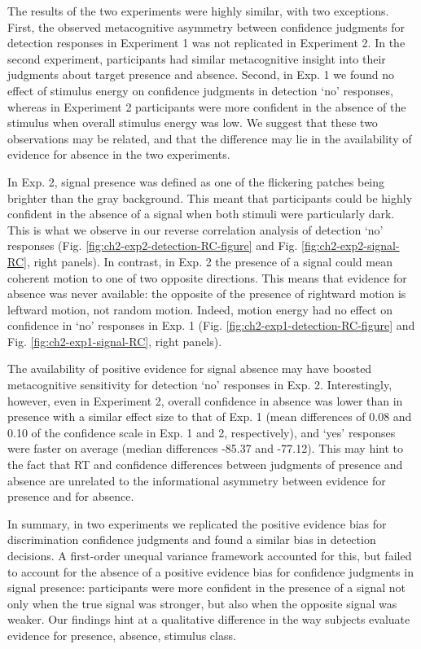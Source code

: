 \documentclass[12pt,twoside]{reedthesis}
\begin{document}
The results of the two experiments were highly similar, with two exceptions. First, the observed metacognitive asymmetry between confidence judgments for detection responses in Experiment 1 was not replicated in Experiment 2. In the second experiment, participants had similar metacognitive insight into their judgments about target presence and absence. Second, in Exp. 1 we found no effect of stimulus energy on confidence judgments in detection `no' responses, whereas in Experiment 2 participants were more confident in the absence of the stimulus when overall stimulus energy was low. We suggest that these two observations may be related, and that the difference may lie in the availability of evidence for absence in the two experiments.

In Exp. 2, signal presence was defined as one of the flickering patches being brighter than the gray background. This meant that participants could be highly confident in the absence of a signal when both stimuli were particularly dark. This is what we observe in our reverse correlation analysis of detection `no' responses (Fig. \ref{fig:ch2-exp2-detection-RC-figure} and Fig. \ref{fig:ch2-exp2-signal-RC}, right panels). In contrast, in Exp. 2 the presence of a signal could mean coherent motion to one of two opposite directions. This means that evidence for absence was never available: the opposite of the presence of rightward motion is leftward motion, not random motion. Indeed, motion energy had no effect on confidence in `no' responses in Exp. 1 (Fig. \ref{fig:ch2-exp1-detection-RC-figure} and Fig. \ref{fig:ch2-exp1-signal-RC}, right panels).

The availability of positive evidence for signal absence may have boosted metacognitive sensitivity for detection `no' responses in Exp. 2. Interestingly, however, even in Experiment 2, overall confidence in absence was lower than in presence with a similar effect size to that of Exp. 1 (mean differences of 0.08 and 0.10 of the confidence scale in Exp. 1 and 2, respectively), and `yes' responses were faster on average (median differences -85.37 and -77.12). This may hint to the fact that RT and confidence differences between judgments of presence and absence are unrelated to the informational asymmetry between evidence for presence and for absence.

In summary, in two experiments we replicated the positive evidence bias for discrimination confidence judgments and found a similar bias in detection decisions. A first-order unequal variance framework accounted for this, but failed to account for the absence of a positive evidence bias for confidence judgments in signal presence: participants were more confident in the presence of a signal not only when the true signal was stronger, but also when the opposite signal was weaker. Our findings hint at a qualitative difference in the way subjects evaluate evidence for presence, absence, stimulus class.
\end{document}
